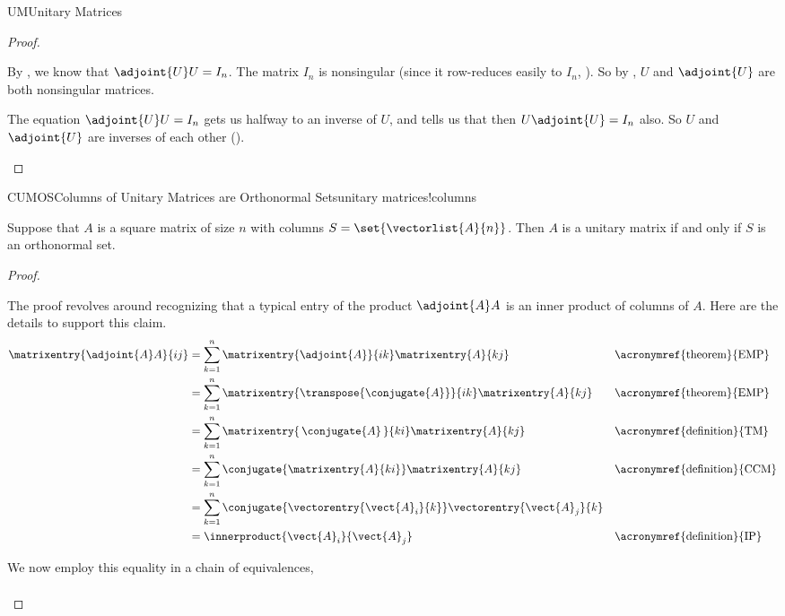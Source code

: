 \begin{subsect}{UM}{Unitary Matrices}
\begin{proof}
\begin{para}By , we know that $\adjoint{U}U=I_n$.  The matrix $I_n$ is nonsingular (since it row-reduces easily to $I_n$, ).  So by , $U$ and $\adjoint{U}$ are both nonsingular matrices.\end{para}
%
\begin{para}The equation $\adjoint{U}U=I_n$ gets us halfway to an inverse of $U$, and  tells us that then $U\adjoint{U}=I_n$ also.  So $U$ and $\adjoint{U}$ are inverses of each other ().\end{para}
%
\end{proof}
%
\begin{theorem}{CUMOS}{Columns of Unitary Matrices are Orthonormal Sets}{unitary matrices!columns}
\begin{para}Suppose that $A$ is a square matrix of size $n$ with columns $S=\set{\vectorlist{A}{n}}$.  Then $A$ is a unitary matrix if and only if $S$ is an orthonormal set.\end{para}
\end{theorem}
%
\begin{proof}
\begin{para}The proof revolves around recognizing that a typical entry of the product $\adjoint{A}A$ is an inner product of columns of $A$.  Here are the details to support this claim.
%
\begin{align*}
\matrixentry{\adjoint{A}A}{ij}
&=\sum_{k=1}^{n}\matrixentry{\adjoint{A}}{ik}\matrixentry{A}{kj}
&&\text{\acronymref{theorem}{EMP}}\\
%
&=\sum_{k=1}^{n}\matrixentry{\transpose{\conjugate{A}}}{ik}\matrixentry{A}{kj}
&&\text{\acronymref{theorem}{EMP}}\\
%
&=\sum_{k=1}^{n}\matrixentry{\,\conjugate{A}\,}{ki}\matrixentry{A}{kj}
&&\text{\acronymref{definition}{TM}}\\
%
&=\sum_{k=1}^{n}\conjugate{\matrixentry{A}{ki}}\matrixentry{A}{kj}
&&\text{\acronymref{definition}{CCM}}\\
%
&=\sum_{k=1}^{n}\conjugate{\vectorentry{\vect{A}_i}{k}}\vectorentry{\vect{A}_j}{k}\\
%
&=\innerproduct{\vect{A}_i}{\vect{A}_j}
&&\text{\acronymref{definition}{IP}}
%
\end{align*}
\end{para}
%
\begin{para}We now employ this equality in a chain of equivalences,
%
\begin{align*}

\end{align*}
\end{para}
\end{proof}
\end{subsect}

